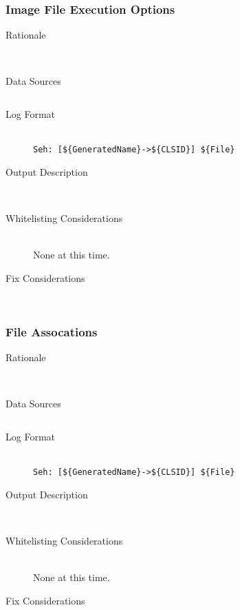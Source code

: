 \subsubsection{Image File Execution Options}
\begin{description}
\item[Rationale] \hfill \\

\item[Data Sources] \hfill
\vspace{-\baselineskip}
\begin{verbatim}

\end{verbatim}
\item[Log Format] \hfill \\
\verb|Seh: [${GeneratedName}->${CLSID}] ${File}|
\item[Output Description] \hfill \\

\item[Whitelisting Considerations] \hfill \\
None at this time.
\item[Fix Considerations] \hfill \\
\end{description}

\subsubsection{File Assocations}
\begin{description}
\item[Rationale] \hfill \\

\item[Data Sources] \hfill
\vspace{-\baselineskip}
\begin{verbatim}

\end{verbatim}
\item[Log Format] \hfill \\
\verb|Seh: [${GeneratedName}->${CLSID}] ${File}|
\item[Output Description] \hfill \\

\item[Whitelisting Considerations] \hfill \\
None at this time.
\item[Fix Considerations] \hfill \\
\end{description}

